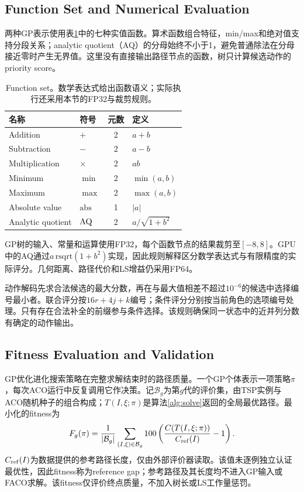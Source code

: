 \subsection{Function Set and Numerical Evaluation}
\label{sec:functions}
两种GP表示使用表\ref{tab:functions}中的七种实值函数。算术函数组合特征，min/max和绝对值支持分段关系；analytic quotient（AQ）的分母始终不小于1，避免普通除法在分母接近零时产生无界值。这里没有直接输出路径节点的函数，树只计算候选动作的priority score。

\begin{table}[tb]
\caption{Function set。数学表达式给出函数语义；实际执行还采用本节的FP32与裁剪规则。}
\label{tab:functions}
\centering
\begin{tabular}{@{}llcl@{}}
\toprule
名称 & 符号 & 元数 & 定义\\ \midrule
Addition & $+$ & 2 & $a+b$\\
Subtraction & $-$ & 2 & $a-b$\\
Multiplication & $\times$ & 2 & $ab$\\
Minimum & $\min$ & 2 & $\min(a,b)$\\
Maximum & $\max$ & 2 & $\max(a,b)$\\
Absolute value & $\mathrm{abs}$ & 1 & $|a|$\\
Analytic quotient & $\operatorname{AQ}$ & 2 & $a/\sqrt{1+b^2}$\\
\bottomrule
\end{tabular}
\end{table}

GP树的输入、常量和运算使用FP32，每个函数节点的结果裁剪至$[-8,8]$。GPU中的AQ通过$a\,\mathrm{rsqrt}(1+b^2)$实现，因此规则解释区分数学表达式与有限精度的实际评分。几何距离、路径代价和LS增益仍采用FP64。

动作解码先求合法候选的最大分数，再在与最大值相差不超过$10^{-6}$的候选中选择编号最小者。联合评分按$16r+4j+k$编号；条件评分分别按当前角色的选项编号处理。只有存在合法补全的前缀参与条件选择。该规则确保同一状态中的近并列分数有确定的动作输出。

\subsection{Fitness Evaluation and Validation}
\label{sec:fitness}
GP优化进化搜索策略在完整求解结束时的路径质量。一个GP个体表示一项策略$\pi$，每次ACO运行中反复调用它作决策。记$\mathcal B_g$为第$g$代的评价集，由TSP实例与ACO随机种子的组合构成；$T(I,\xi;\pi)$是算法\ref{alg:solve}返回的全局最优路径。最小化的fitness为
\begin{equation}
 F_g(\pi)=\frac{1}{|\mathcal B_g|}\sum_{(I,\xi)\in\mathcal B_g}
 100\left(\frac{C(T(I,\xi;\pi))}{C_{\rm ref}(I)}-1\right).
 \label{eq:fitness}
\end{equation}
$C_{\rm ref}(I)$为数据提供的参考路径长度，仅由外部评价器读取。该值未逐例独立认证最优性，因此fitness称为reference gap；参考路径及其长度均不进入GP输入或FACO求解。该fitness仅评价终点质量，不加入树长或LS工作量惩罚。

